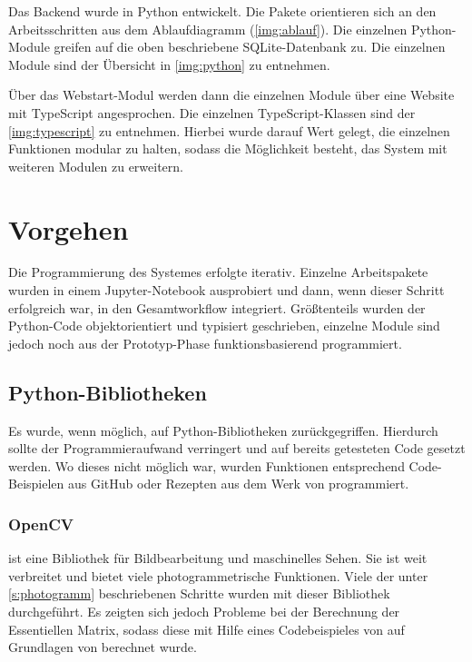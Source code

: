 \documentclass[./00PhotoBox.tex]{subfiles}
\begin{document}
Das Backend wurde in Python entwickelt. Die Pakete orientieren sich an den Arbeitsschritten aus dem Ablaufdiagramm (\autoref{img:ablauf}). Die einzelnen Python-Module greifen auf die oben beschriebene SQLite-Datenbank zu. Die einzelnen Module sind der Übersicht in \autoref{img:python} zu entnehmen.

Über das Webstart-Modul werden dann die einzelnen Module über eine Website mit TypeScript angesprochen. Die einzelnen TypeScript-Klassen sind der \autoref{img:typescript} zu entnehmen. Hierbei wurde darauf Wert gelegt, die einzelnen Funktionen modular zu halten, sodass die Möglichkeit besteht, das System mit weiteren Modulen zu erweitern.




\section{Vorgehen}
\label{ss:vorgehen}

Die Programmierung des Systemes erfolgte iterativ. Einzelne Arbeitspakete wurden in einem Jupyter-Notebook ausprobiert und dann, wenn dieser Schritt erfolgreich war, in den Gesamtworkflow integriert. Größtenteils wurden der Python-Code objektorientiert und typisiert geschrieben, einzelne Module sind jedoch noch aus der Prototyp-Phase funktionsbasierend programmiert.

\subsection{Python-Bibliotheken}
Es wurde, wenn möglich, auf Python-Bibliotheken zurückgegriffen. Hierdurch sollte der Programmieraufwand verringert und auf bereits getesteten Code gesetzt werden. Wo dieses nicht möglich war, wurden Funktionen entsprechend Code-Beispielen aus GitHub oder \glqq Rezepten\grqq{} aus dem Werk von \citeauthor{hartley} programmiert.

\subsubsection{OpenCV}
ist eine Bibliothek für Bildbearbeitung und maschinelles Sehen. Sie ist weit verbreitet und bietet viele photogrammetrische Funktionen. Viele der unter \autoref{s:photogramm} beschriebenen Schritte wurden mit dieser Bibliothek durchgeführt. \citep{opencv} Es zeigten sich jedoch Probleme bei der Berechnung der Essentiellen Matrix, sodass diese mit Hilfe eines Codebeispieles von \cite{3drec} auf Grundlagen von \cite{hartley} berechnet wurde.
\end{document}
